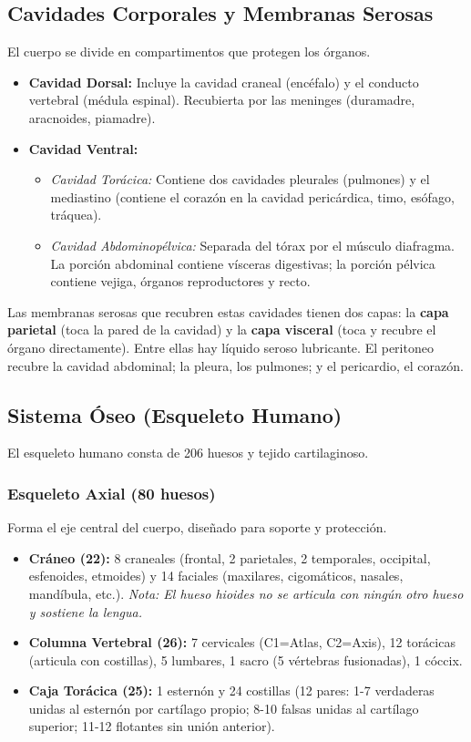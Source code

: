 \subsection{Cavidades Corporales y Membranas Serosas}
El cuerpo se divide en compartimentos que protegen los órganos.
\begin{itemize}
    \item \textbf{Cavidad Dorsal:} Incluye la cavidad craneal (encéfalo) y el conducto vertebral (médula espinal). Recubierta por las meninges (duramadre, aracnoides, piamadre).
    \item \textbf{Cavidad Ventral:}
    \begin{itemize}
        \item \textit{Cavidad Torácica:} Contiene dos cavidades pleurales (pulmones) y el mediastino (contiene el corazón en la cavidad pericárdica, timo, esófago, tráquea).
        \item \textit{Cavidad Abdominopélvica:} Separada del tórax por el músculo diafragma. La porción abdominal contiene vísceras digestivas; la porción pélvica contiene vejiga, órganos reproductores y recto.
    \end{itemize}
\end{itemize}
\begin{tcolorbox}[colback=blue!5!white,colframe=blue!75!black,title=Nota de estudio]
Las membranas serosas que recubren estas cavidades tienen dos capas: la \textbf{capa parietal} (toca la pared de la cavidad) y la \textbf{capa visceral} (toca y recubre el órgano directamente). Entre ellas hay líquido seroso lubricante. El peritoneo recubre la cavidad abdominal; la pleura, los pulmones; y el pericardio, el corazón.
\end{tcolorbox}

\subsection{Sistema Óseo (Esqueleto Humano)}
El esqueleto humano consta de 206 huesos y tejido cartilaginoso.
\subsubsection{Esqueleto Axial (80 huesos)}
Forma el eje central del cuerpo, diseñado para soporte y protección.
\begin{itemize}
    \item \textbf{Cráneo (22):} 8 craneales (frontal, 2 parietales, 2 temporales, occipital, esfenoides, etmoides) y 14 faciales (maxilares, cigomáticos, nasales, mandíbula, etc.). \textit{Nota: El hueso hioides no se articula con ningún otro hueso y sostiene la lengua.}
    \item \textbf{Columna Vertebral (26):} 7 cervicales (C1=Atlas, C2=Axis), 12 torácicas (articula con costillas), 5 lumbares, 1 sacro (5 vértebras fusionadas), 1 cóccix.
    \item \textbf{Caja Torácica (25):} 1 esternón y 24 costillas (12 pares: 1-7 verdaderas unidas al esternón por cartílago propio; 8-10 falsas unidas al cartílago superior; 11-12 flotantes sin unión anterior).
\end{itemize}

